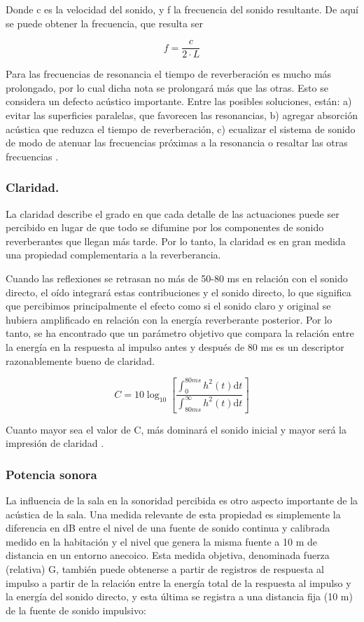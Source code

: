 Donde c es la velocidad del sonido, y f la frecuencia del sonido resultante. De aquí se puede obtener la frecuencia, que resulta ser

\begin{equation}
f = \frac{c}{2\cdot L}
\end{equation}

Para las frecuencias de resonancia el tiempo de reverberación es mucho más prolongado, por lo cual dicha nota se prolongará más que las otras. Esto se considera un defecto acústico importante. Entre las posibles soluciones, están: a) evitar las superficies paralelas, que favorecen las resonancias, b) agregar absorción acústica que reduzca el tiempo de reverberación, c) ecualizar el sistema de sonido de modo de atenuar las frecuencias próximas a la resonancia o resaltar las otras frecuencias \cite{Miyara2004}.

\subsubsection{Claridad.} La claridad describe el grado en que cada detalle de las actuaciones puede ser percibido en lugar de que todo se difumine por los componentes de sonido reverberantes que llegan más tarde. Por lo tanto, la claridad es en gran medida una propiedad complementaria a la reverberancia.

Cuando las reflexiones se retrasan no más de 50-80 ms en relación con el sonido directo, el oído integrará estas contribuciones y el sonido directo, lo que significa que percibimos principalmente el efecto como si el sonido claro y original se hubiera amplificado en relación con la energía reverberante posterior. Por lo tanto, se ha encontrado que un parámetro objetivo que compara la relación entre la energía en la respuesta al impulso antes y después de 80 ms es un descriptor razonablemente bueno de claridad.

\begin{equation}
C = 10\log_{10}\left[{\frac{\int_0^{80ms} h^2(t) \mathrm{d}t}{\int_{80ms}^{\infty} h^2(t) \mathrm{d}t}}\right]
\end{equation}

Cuanto mayor sea el valor de C, más dominará el sonido inicial y mayor será la impresión de claridad \cite{Rossing2007}.

\subsubsection{Potencia sonora} La influencia de la sala en la sonoridad percibida es otro aspecto importante de la acústica de la sala. Una medida relevante de esta propiedad es simplemente la diferencia en dB entre el nivel de una fuente de sonido continua y calibrada medido en la habitación y el nivel que genera la misma fuente a 10 m de distancia en un entorno anecoico. Esta medida objetiva, denominada fuerza (relativa) G, también puede obtenerse a partir de registros de respuesta al impulso a partir de la relación entre la energía total de la respuesta al impulso y la energía del sonido directo, y esta última se registra a una distancia fija (10 m) de la fuente de sonido impulsivo:

